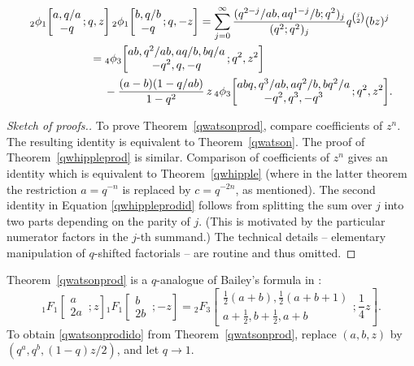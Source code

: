 \begin{theorem}\label{qwhippleprod}
\begin{subequations}\label{qwhippleprodid}
\begin{align}
{}_2\phi_1\!\left[\begin{matrix}a,q/a\\
-q\end{matrix}\,;q,z\right]
{}_2\phi_1\!\left[\begin{matrix}b,q/b\\
-q\end{matrix}\,;q,-z\right]
=\sum_{j=0}^\infty\frac{(q^{2-j}/ab,aq^{1-j}/b;q^2)_j}
{(q^2;q^2)_j}q^{\binom j2}(bz)^j&\\
={}_4\phi_3\!\left[\begin{matrix}ab,q^2/ab,aq/b,bq/a\\
-q^2,q,-q\end{matrix}\,;q^2,z^2\right]
\qquad\qquad\qquad\qquad\qquad\quad&\notag\\[.1em]
{}-\frac{(a-b)(1-q/ab)}{1-q^2}\,z\,
{}_4\phi_3\!\left[\begin{matrix}abq,q^3/ab,aq^2/b,bq^2/a\\
-q^2,q^3,-q^3\end{matrix}\,;q^2,z^2\right]&.
\end{align}
\end{subequations}
\end{theorem}

\begin{proof}[Sketch of proofs.]
To prove Theorem~\ref{qwatsonprod}, compare coefficients
of $z^n$. The resulting identity is equivalent to Theorem~\ref{qwatson}.
The proof of Theorem~\ref{qwhippleprod} is similar.
Comparison of coefficients of $z^n$ gives an identity which is
equivalent to Theorem~\ref{qwhipple} (where in the latter theorem
the restriction $a=q^{-n}$ is replaced by $c=q^{-2n}$, as mentioned).
The second identity in Equation \eqref{qwhippleprodid} follows from
splitting the sum over $j$ into two parts depending on the parity of $j$.
(This is motivated by the particular numerator factors in the $j$-th summand.)
The technical details -- elementary manipulation of
$q$-shifted factorials -- are routine and thus omitted.
\end{proof}

Theorem~\ref{qwatsonprod} is a $q$-analogue of Bailey's
formula in \cite[p.~246, Equation~(2.11)]{B}:
\begin{equation}\label{qwatsonprodido}
{}_1F_1\!\left[\begin{matrix}a\\
2a\end{matrix}\,;z\right]
{}_1F_1\!\left[\begin{matrix}b\\
2b\end{matrix}\,;-z\right]
={}_2F_3\!\left[\begin{matrix}\frac 12(a+b),\frac 12(a+b+1)\\
a+\frac 12,b+\frac 12,a+b\end{matrix};\frac 14z\right].
\end{equation}
To obtain \eqref{qwatsonprodido} from Theorem~\ref{qwatsonprod},
replace $(a,b,z)$ by $(q^a,q^b,(1-q)z/2)$, and let $q\to 1$.

